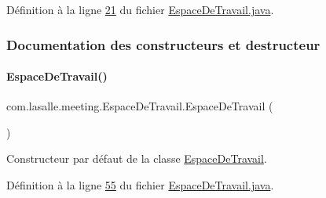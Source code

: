 Définition à la ligne \hyperlink{_espace_de_travail_8java_source_l00021}{21} du fichier \hyperlink{_espace_de_travail_8java_source}{Espace\+De\+Travail.\+java}.



\subsubsection{Documentation des constructeurs et destructeur}
\mbox{\label{classcom_1_1lasalle_1_1meeting_1_1_espace_de_travail_a3940b7fa99249447112b00ec89fcd3d1}} 
\paragraph{\texorpdfstring{Espace\+De\+Travail()}{EspaceDeTravail()}\hspace{0.1cm}{\footnotesize\ttfamily [1/2]}}
{\footnotesize\ttfamily com.\+lasalle.\+meeting.\+Espace\+De\+Travail.\+Espace\+De\+Travail (\begin{DoxyParamCaption}{ }\end{DoxyParamCaption})}



Constructeur par défaut de la classe \hyperlink{classcom_1_1lasalle_1_1meeting_1_1_espace_de_travail}{Espace\+De\+Travail}. 



Définition à la ligne \hyperlink{_espace_de_travail_8java_source_l00055}{55} du fichier \hyperlink{_espace_de_travail_8java_source}{Espace\+De\+Travail.\+java}.


